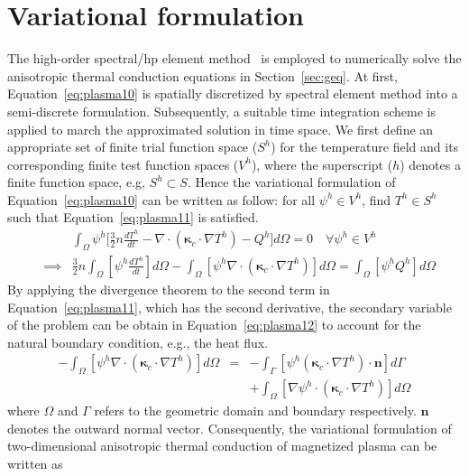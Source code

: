 \documentclass[runningheads]{llncs}
\begin{document}
\section{Variational formulation}
The high-order spectral/hp element method~\cite{karniadakis2013spectral} is employed to numerically solve the anisotropic thermal conduction equations in Section~\ref{sec:geq}. At first, Equation~\eqref{eq:plasma10} is spatially discretized by spectral element method into a semi-discrete formulation. Subsequently, a suitable time integration scheme is applied to march the approximated solution in time space. We first define an appropriate set of finite trial function space ($S^h$) for the temperature field and its corresponding finite test function spaces ($V^h$), where the superscript ($h$) denotes a finite function space, e.g, $S^h \subset S$. Hence the variational formulation of Equation~\eqref{eq:plasma10} can be written as follow: for all $\psi^h \in V^h$, find $T^h \in S^h$ such that Equation~\eqref{eq:plasma11} is satisfied. 
\begin{eqnarray}
& &\int_{\Omega} \psi^h \Big[\frac{3}{2} n \frac{d T^h}{d t} -\nabla \cdot (\bm{\kappa}_c \cdot \nabla T^h) -Q^h\Big] d\Omega = 0 \quad \forall \psi^h \in V^h \nonumber\\
&\implies&\frac{3}{2} n \int_{\Omega} [\psi^h\frac{d T^h}{d t}]d\Omega - \int_{\Omega} [\psi^h \nabla \cdot (\bm{\kappa}_c \cdot \nabla T^h)] d \Omega  = \int_{\Omega} [\psi^h Q^h] d\Omega \label{eq:plasma11}
\end{eqnarray}
By applying the divergence theorem to the second term in Equation~\eqref{eq:plasma11}, which has the second derivative, the secondary variable of the problem can be obtain in Equation~\eqref{eq:plasma12} to account for the natural boundary condition, e.g., the heat flux.
\begin{eqnarray}
-\int_{\Omega} [\psi^h \nabla \cdot (\bm{\kappa}_c \cdot \nabla T^h)]d\Omega &=& -\int_{\Gamma} [\psi^h (\bm{\kappa}_c \cdot \nabla T^h)\cdot \bm{n}] d\Gamma \nonumber\\
& &+ \int_{\Omega} [\nabla \psi^h \cdot (\bm{\kappa}_c \cdot \nabla T^h)]d\Omega \label{eq:plasma12}
\end{eqnarray}
where $\Omega$ and $\Gamma$ refers to the geometric domain and boundary respectively. $\bm{n}$ denotes the outward normal vector. Consequently, the variational formulation of two-dimensional anisotropic thermal conduction of magnetized plasma can be written as
\end{document}
